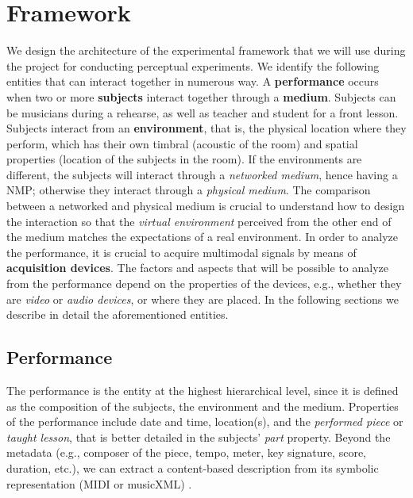 \section{Framework}
We design the architecture of the experimental framework that we will use during the project for conducting perceptual experiments. We identify the following entities that can interact together in numerous way. A \textbf{performance} occurs when two or more \textbf{subjects} interact together through a \textbf{medium}. Subjects can be musicians during a rehearse, as well as teacher and student for a front lesson. Subjects interact from an \textbf{environment}, that is, the physical location where they perform, which has their own timbral (acoustic of the room) and spatial properties (location of the subjects in the room). If the environments are different, the subjects will interact through a \textit{networked medium}, hence having a NMP; otherwise they interact through a \textit{physical medium}. The comparison between a networked and physical medium is crucial to understand how to design the interaction so that the \textit{virtual environment} perceived from the other end of the medium matches the expectations of a real environment. In order to analyze the performance, it is crucial to acquire multimodal signals by means of  \textbf{acquisition devices}. The factors and aspects that will be possible to analyze from the performance depend on the properties of the devices, e.g., whether they are \textit{video} or \textit{audio devices}, or where they are placed. In the following sections we describe in detail the aforementioned entities.


\subsection{Performance}
The performance is the entity at the highest hierarchical level, since it is defined as the composition of the subjects, the environment and the medium. 
Properties of the performance include date and time, location(s), and the \textit{performed piece} or \textit{taught lesson}, that is better detailed in the subjects' \textit{part} property. Beyond the metadata (e.g., composer of the piece, tempo, meter, key signature, score, duration, etc.), we can extract a content-based description from its symbolic representation (MIDI or musicXML) \cite{MIDItoolbox}.

